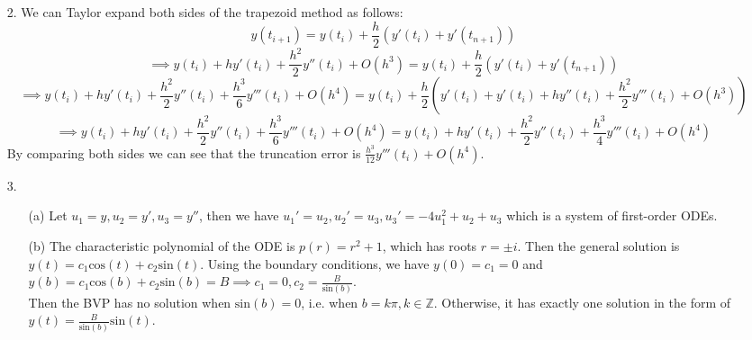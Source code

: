 \documentclass{article}
\begin{document}
\begin{itemize}
\begin{itemize}
          \end{itemize}
\end{itemize}

\newpage
\begin{itemize}
    \item [2.] We can Taylor expand both sides of the trapezoid method as follows:
          \[y(t_{i+1})=y(t_i)+\frac{h}{2}(y'(t_i)+y'(t_{n+1}))\]
          \[\implies y(t_i)+hy'(t_i)+\frac{h^2}{2}y''(t_i)+O(h^3)=y(t_i)+\frac{h}{2}(y'(t_i)+y'(t_{n+1}))\]
          \[\implies y(t_i)+hy'(t_i)+\frac{h^2}{2}y''(t_i)+\frac{h^3}{6}y'''(t_i)+O(h^4)=y(t_i)+\frac{h}{2}(y'(t_i)+y'(t_i)+hy''(t_i)+\frac{h^2}{2}y'''(t_i)+O(h^3))\]
          \[\implies y(t_i)+hy'(t_i)+\frac{h^2}{2}y''(t_i)+\frac{h^3}{6}y'''(t_i)+O(h^4)=y(t_i)+hy'(t_i)+\frac{h^2}{2}y''(t_i)+\frac{h^3}{4}y'''(t_i)+O(h^4)\]
          By comparing both sides we can see that the truncation error is $\frac{h^3}{12}y'''(t_i)+O(h^4)$.
\end{itemize}

\newpage
\begin{itemize}
    \item [3.]
          \begin{itemize}
              \item [(a)] Let $u_1=y,u_2=y',u_3=y''$, then we have $u_1'=u_2,u_2'=u_3,u_3'=-4u_1^2+u_2+u_3$ which is a system of first-order ODEs.
              \item [(b)] The characteristic polynomial of the ODE is $p(r)=r^2+1$, which has roots $r=\pm i$. Then the general solution is $y(t)=c_1\text{cos}(t)+c_2\text{sin}(t)$. Using the boundary conditions, we have $y(0)=c_1=0$ and $y(b)=c_1\text{cos}(b)+c_2\text{sin}(b)=B\implies c_1=0, c_2=\frac{B}{\text{sin}(b)}$.\\Then the BVP has no solution when $\text{sin}(b)=0$, i.e. when $b=k\pi,k\in\mathbb{Z}$. Otherwise, it has exactly one solution in the form of $y(t)=\frac{B}{\text{sin}(b)}\text{sin}(t)$.
          \end{itemize}
\end{itemize}
\end{document}
